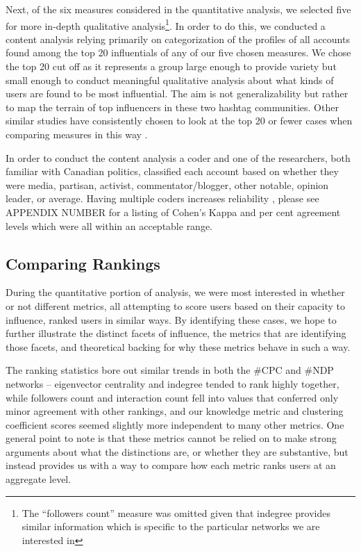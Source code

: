 \documentclass[a4paper,12pt]{article}
\begin{document}
Next, of the six measures considered in the quantitative analysis, we selected five for more in-depth qualitative analysis\footnote{The ``followers count'' measure was omitted given that indegree provides similar information which is specific to the particular networks we are interested in}. In order to do this, we conducted a content analysis relying primarily on categorization \cite{mileshuberman} of the profiles of all accounts found among the top 20 influentials of any of our five chosen measures. We chose the top 20 cut off as it represents a group large enough to provide variety but small enough to conduct meaningful qualitative analysis about what kinds of users are found to be most influential. The aim is not generalizability but rather to map the terrain of top influencers in these two hashtag communities. Other similar studies have consistently chosen to look at the top 20 or fewer cases when comparing measures in this way \cite{Cha, WuHofmanMasonWatts2011}. 

In order to conduct the content analysis a coder and one of the researchers, both familiar with Canadian politics, classified each account based on whether they were media, partisan, activist, commentator/blogger, other notable, opinion leader, or average. Having multiple coders increases reliability \cite{potterlevine}, please see APPENDIX NUMBER for a listing of Cohen's Kappa and per cent agreement levels which were all within an acceptable range. 

\subsection{Comparing Rankings}

During the quantitative portion of analysis, we were most interested in whether or not different metrics, all attempting to score users based on their capacity to influence, ranked users in similar ways. By identifying these cases, we hope to further illustrate the distinct facets of influence, the metrics that are identifying those facets, and theoretical backing for why these metrics behave in such a way.

The ranking statistics bore out similar trends in both the \#CPC and \#NDP networks -- eigenvector centrality and indegree tended to rank highly together, while followers count and interaction count fell into values that conferred only minor agreement with other rankings, and our knowledge metric and clustering coefficient scores seemed slightly more independent to many other metrics. One general point to note is that these metrics cannot be relied on to make strong arguments about what the distinctions are, or whether they are substantive, but instead provides us with a way to compare how each metric ranks users at an aggregate level. 
\end{document}

